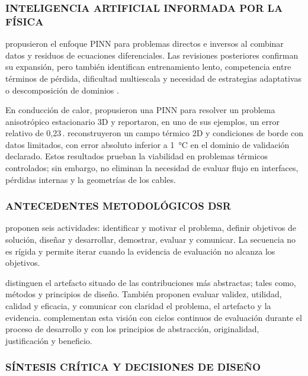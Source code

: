 \subsubsection{INTELIGENCIA ARTIFICIAL INFORMADA POR LA FÍSICA}

\textcite[686--690]{raissi2019} propusieron el enfoque PINN para problemas directos e inversos al combinar datos y residuos de ecuaciones diferenciales. Las revisiones posteriores confirman su expansión, pero también identifican entrenamiento lento, competencia entre términos de pérdida, dificultad multiescala y necesidad de estrategias adaptativas o descomposición de dominios \parencites[1--2,14--17]{lawal2022}[2--6]{ren2025}.

En conducción de calor, \textcite[1,3,17]{xing2023} propusieron una PINN para resolver un problema anisotrópico estacionario 3D y reportaron, en uno de sus ejemplos, un error relativo de 0,23\,\pct. \textcite[1,3,16]{pan2025} reconstruyeron un campo térmico 2D y condiciones de borde con datos limitados, con error absoluto inferior a \SI{1}{\celsius} en el dominio de validación declarado. Estos resultados prueban la viabilidad en problemas térmicos controlados; sin embargo, no eliminan la necesidad de evaluar flujo en interfaces, pérdidas internas y la geometrías de los cables.

\subsubsection{ANTECEDENTES METODOLÓGICOS DSR}

\textcite[54--56]{peffers2007} proponen seis actividades: identificar y motivar el problema, definir objetivos de solución, diseñar y desarrollar, demostrar, evaluar y comunicar. La secuencia no es rígida y permite iterar cuando la evidencia de evaluación no alcanza los objetivos.

\textcite[342--350]{gregor2013} distinguen el artefacto situado de las contribuciones más abstractas; tales como, métodos y principios de diseño. También proponen evaluar validez, utilidad, calidad y eficacia, y comunicar con claridad el problema, el artefacto y la evidencia. \textcite[198--203]{delport2024} complementan esta visión con ciclos continuos de evaluación durante el proceso de desarrollo y con los principios de abstracción, originalidad, justificación y beneficio.

\subsubsection{SÍNTESIS CRÍTICA Y DECISIONES DE DISEÑO}


